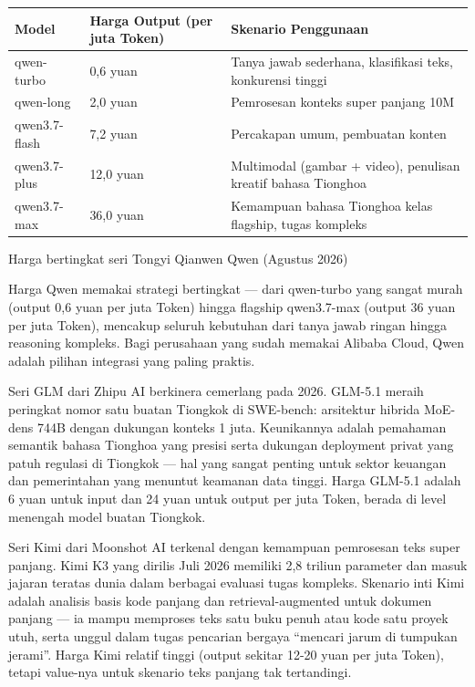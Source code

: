 \begin{center}
\begin{tabularx}{\linewidth}{|X|X|X|}
\hline
\textbf{Model} & \textbf{Harga Output (per juta Token)} & \textbf{Skenario Penggunaan} \tabularnewline
\hline
qwen-turbo & 0,6 yuan & Tanya jawab sederhana, klasifikasi teks, konkurensi tinggi \tabularnewline
qwen-long & 2,0 yuan & Pemrosesan konteks super panjang 10M \tabularnewline
qwen3.7-flash & 7,2 yuan & Percakapan umum, pembuatan konten \tabularnewline
qwen3.7-plus & 12,0 yuan & Multimodal (gambar + video), penulisan kreatif bahasa Tionghoa \tabularnewline
qwen3.7-max & 36,0 yuan & Kemampuan bahasa Tionghoa kelas flagship, tugas kompleks \tabularnewline
\hline
\end{tabularx}
\end{center}

\begin{center}\small\color{gray}Harga bertingkat seri Tongyi Qianwen Qwen (Agustus 2026)\end{center}

Harga Qwen memakai strategi bertingkat — dari qwen-turbo yang sangat murah (output 0,6 yuan per juta Token) hingga flagship qwen3.7-max (output 36 yuan per juta Token), mencakup seluruh kebutuhan dari tanya jawab ringan hingga reasoning kompleks. Bagi perusahaan yang sudah memakai Alibaba Cloud, Qwen adalah pilihan integrasi yang paling praktis.


Seri GLM dari Zhipu AI berkinera cemerlang pada 2026. GLM-5.1 meraih peringkat nomor satu buatan Tiongkok di SWE-bench: arsitektur hibrida MoE-dens 744B dengan dukungan konteks 1 juta. Keunikannya adalah pemahaman semantik bahasa Tionghoa yang presisi serta dukungan deployment privat yang patuh regulasi di Tiongkok — hal yang sangat penting untuk sektor keuangan dan pemerintahan yang menuntut keamanan data tinggi. Harga GLM-5.1 adalah 6 yuan untuk input dan 24 yuan untuk output per juta Token, berada di level menengah model buatan Tiongkok.


Seri Kimi dari Moonshot AI terkenal dengan kemampuan pemrosesan teks super panjang. Kimi K3 yang dirilis Juli 2026 memiliki 2,8 triliun parameter dan masuk jajaran teratas dunia dalam berbagai evaluasi tugas kompleks. Skenario inti Kimi adalah analisis basis kode panjang dan retrieval-augmented untuk dokumen panjang — ia mampu memproses teks satu buku penuh atau kode satu proyek utuh, serta unggul dalam tugas pencarian bergaya “mencari jarum di tumpukan jerami”. Harga Kimi relatif tinggi (output sekitar 12-20 yuan per juta Token), tetapi value-nya untuk skenario teks panjang tak tertandingi.

